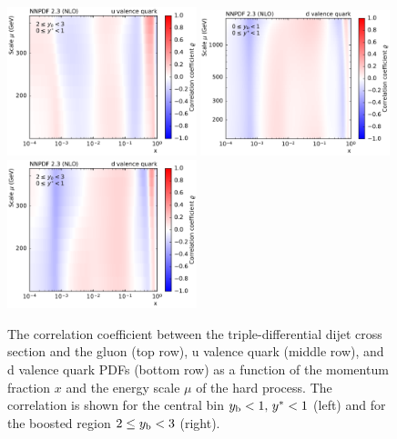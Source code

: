 \begin{figure}[p]
  \includegraphics[width=0.49\textwidth]{figures/pdf_constraints/corr_PTMAXEXPYS_YBYS_NLO_FINALBINS_NNPDF23_u_valence_quark_ys0_0yb2_0_cl.pdf}
  \includegraphics[width=0.49\textwidth]{figures/pdf_constraints/corr_PTMAXEXPYS_YBYS_NLO_FINALBINS_NNPDF23_d_valence_quark_ys0_0yb0_0_cl.pdf}\hfill%
  \includegraphics[width=0.49\textwidth]{figures/pdf_constraints/corr_PTMAXEXPYS_YBYS_NLO_FINALBINS_NNPDF23_d_valence_quark_ys0_0yb2_0_cl.pdf}
  \caption[Correlation between dijet cross section and PDFs]{
    The correlation coefficient between the triple-differential dijet cross
    section and the gluon (top row), u valence quark (middle row),
    and d valence quark PDFs (bottom row) as a function of the
    momentum fraction $x$ and the energy scale $\mu$ of
    the hard process. The correlation is shown for the central
    bin $y_{\mathrm{b}} < 1,\,y^{*} < 1$ (left) and for the boosted region $2 \leq
    y_{\mathrm{b}} < 3$ (right).}
  \label{fig:correlation_pdf_xs_gqq}
\end{figure}


